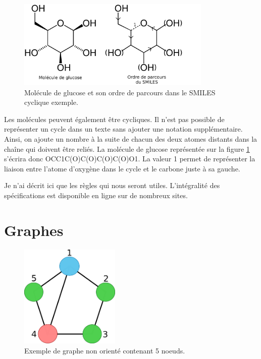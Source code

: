\begin{figure}[h!]
  \begin{center}
    \includegraphics[width=350px]{Figures/Prerequis/glucose.png}
    \caption{\label{glucose}Molécule de glucose et son ordre de parcours dans le SMILES cyclique exemple.}
  \end{center}
\end{figure}

Les molécules peuvent également être cycliques.
Il n'est pas possible de représenter un cycle dans un texte sans ajouter une notation supplémentaire.
Ainsi, on ajoute un nombre à la suite de chacun des deux atomes distants dans la chaîne qui doivent être reliés.
La molécule de glucose représentée sur la figure \ref{glucose} s'écrira donc OCC1C(O)C(O)C(O)C(O)O1.
La valeur 1 permet de représenter la liaison entre l'atome d'oxygène dans le cycle et le carbone juste à sa gauche.

Je n'ai décrit ici que les règles qui nous seront utiles.
L'intégralité des spécifications est disponible en ligne sur de nombreux sites.



\section{Graphes}
\label{graphes}

\begin{figure}[h!]
  \begin{center}
    \includegraphics[width=180px]{Figures/Prerequis/graphe.png}
    \caption{\label{graphe_def}Exemple de graphe non orienté contenant 5 noeuds.}
  \end{center}
\end{figure}

